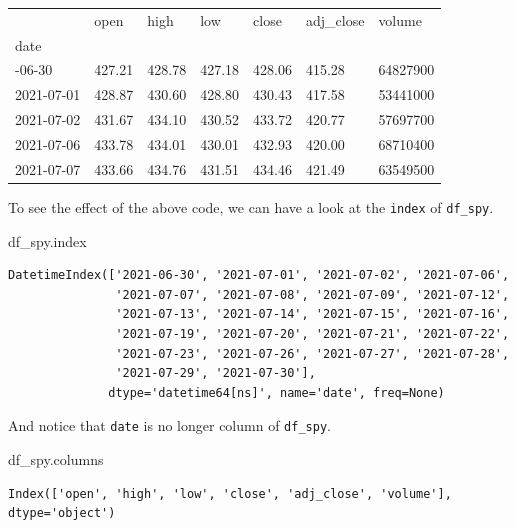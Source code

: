 \documentclass[
  letterpaper,
  DIV=11,
  numbers=noendperiod]{scrreprt}
\newenvironment{Shaded}{\begin{snugshade}}{\end{snugshade}}
\newcommand{\NormalTok}[1]{\textcolor[rgb]{0.00,0.23,0.31}{#1}}
\begin{document}
\begin{longtable}[]{@{}lllllll@{}}
\toprule\noalign{}
& open & high & low & close & adj\_close & volume \\
date & & & & & & \\
\midrule\noalign{}
\endhead
\bottomrule\noalign{}
\endlastfoot
2021-06-30 & 427.21 & 428.78 & 427.18 & 428.06 & 415.28 & 64827900 \\
2021-07-01 & 428.87 & 430.60 & 428.80 & 430.43 & 417.58 & 53441000 \\
2021-07-02 & 431.67 & 434.10 & 430.52 & 433.72 & 420.77 & 57697700 \\
2021-07-06 & 433.78 & 434.01 & 430.01 & 432.93 & 420.00 & 68710400 \\
2021-07-07 & 433.66 & 434.76 & 431.51 & 434.46 & 421.49 & 63549500 \\
\end{longtable}

To see the effect of the above code, we can have a look at the
\texttt{index} of \texttt{df\_spy}.

\begin{Shaded}
\begin{Highlighting}[]
\NormalTok{df\_spy.index}
\end{Highlighting}
\end{Shaded}

\begin{verbatim}
DatetimeIndex(['2021-06-30', '2021-07-01', '2021-07-02', '2021-07-06',
               '2021-07-07', '2021-07-08', '2021-07-09', '2021-07-12',
               '2021-07-13', '2021-07-14', '2021-07-15', '2021-07-16',
               '2021-07-19', '2021-07-20', '2021-07-21', '2021-07-22',
               '2021-07-23', '2021-07-26', '2021-07-27', '2021-07-28',
               '2021-07-29', '2021-07-30'],
              dtype='datetime64[ns]', name='date', freq=None)
\end{verbatim}

And notice that \texttt{date} is no longer column of \texttt{df\_spy}.

\begin{Shaded}
\begin{Highlighting}[]
\NormalTok{df\_spy.columns}
\end{Highlighting}
\end{Shaded}

\begin{verbatim}
Index(['open', 'high', 'low', 'close', 'adj_close', 'volume'], dtype='object')
\end{verbatim}
\end{document}
